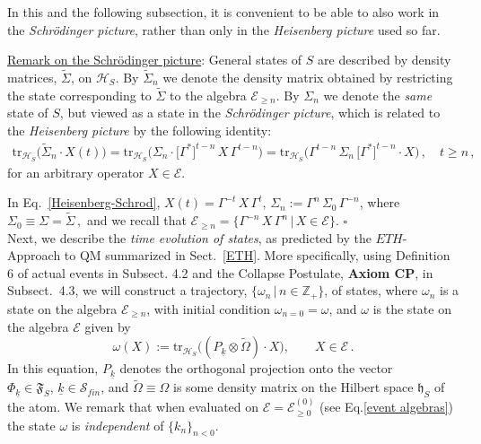 \documentclass[a4paper,11pt]{article}
\begin{document}
In this and the following subsection, it is convenient to be able to also work in the \textit{Schr\"odinger picture}, rather than 
only in the \textit{Heisenberg picture} used so far. 

\underline{Remark on the Schr\"odinger picture}: General states of $S$ are described by density matrices, 
$\widetilde{\Sigma}$, on $\mathcal{H}_S$. By
$\widetilde{\Sigma}_{n}$ we denote the density matrix obtained by restricting the state corresponding to $\widetilde{\Sigma}$ to the algebra $\mathcal{E}_{\geq n}$. By 
$\Sigma_{n}$ we denote the \textit{same} state of $S$, but viewed as a state in the \textit{Schr\"odinger picture}, which is related to the \textit{Heisenberg  picture} by the following identity: 
\begin{align}\label{Heisenberg-Schrod}
\text{tr}_{\mathcal{H}_S}\big(\widetilde{\Sigma}_{n}\cdot X(t)\big) = \text{tr}_{\mathcal{H}_S} \big(\Sigma_{n}\cdot
\big[\Gamma^{*}\big]^{t-n} \,X\, \Gamma^{t-n}\big) = \text{tr}_{\mathcal{H}_S} \big(\Gamma^{t-n}\,\Sigma_{n} \,
\big[\Gamma^{*}\big]^{t-n}\cdot X\big)\,, \quad t\geq n\,,
\end{align}
for an arbitrary operator $X \in \mathcal{E}$. 

In Eq.~\eqref{Heisenberg-Schrod},  $X(t)= \Gamma^{-t} \,X\, \Gamma^{t}$, 
$\Sigma_n := \Gamma^{n}\, \Sigma_{0}\, \Gamma^{-n}$, where $\Sigma_{0}\equiv \Sigma = \widetilde{\Sigma}\,,$  and
we recall that $\mathcal{E}_{\geq n}=\big\{\Gamma^{-n}\,X\,\Gamma^{n}\,\big|\, X\in \mathcal{E}\big\}$. \hspace{10cm}
$\square$\\

Next, we describe the \textit{time evolution of states}, as predicted by the $ETH$-Approach to QM summarized 
in Sect.~\ref{ETH}. More specifically, using Definition 6 of actual events in Subsect. 4.2 and the Collapse Postulate, {\bf{Axiom CP}}, in Subsect.~4.3, we will construct a trajectory, $\big\{\omega_n\, \big| \, n\in \mathbb{Z}_{+}\big\}$, 
of states, where $\omega_n$ is a state on the algebra $\mathcal{E}_{\geq n}$, with initial condition 
$\omega_{n=0}=\omega$, and $\omega$ is the state on the algebra $\mathcal{E}$ given by
\begin{equation}\label{initial cond}
\omega(X):= \text{tr}_{\mathcal{H}_S}\big((P_{\underline{k}} \otimes \widetilde{\Omega})\cdot X\big), \qquad X\in \mathcal{E}\,.
\end{equation}
In this equation, $P_{\underline{k}}$ denotes the orthogonal projection onto the vector 
$\Phi_{\underline{k}} \in \mathfrak{F}_S,\,  \underline{k}\in \mathcal{S}_{fin}$, and $\widetilde{\Omega}\equiv \Omega$ 
is some density matrix on the Hilbert space $\mathfrak{h}_S$ of the atom. 
We remark that when evaluated on $\mathcal{E}= \mathcal{E}_{\geq 0}^{(0)}$ (see Eq.\eqref{event algebras}) the state $\omega$ 
is \textit{independent} of $\{k_n\}_{n<0}$. 
\end{document}

